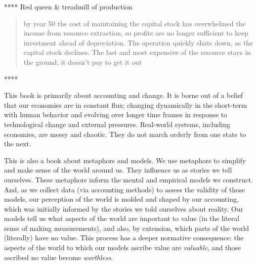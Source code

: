 
****	Red queen \& treadmill of production





\begin{quote}
by year 50 the cost of maintaining the capital stock 
has overwhelmed the income from resource extraction, 
so profits are no longer sufficient to keep investment ahead of depreciation. 
The operation quickly shuts down, as the capital stock declines. 
The last and most expensive of the resource stays in the ground; 
it doesn't pay to get it out~\cite[p.60]{Meadows2008}
\end{quote}
****

This book is primarily about accounting and change.
It is borne out of a belief that our economies are in constant flux;
changing dynamically in the short-term with human behavior
and evolving over longer time frames 
in response to technological change and
external pressures.
Real-world systems, including economies, are messy and chaotic.
They do not march orderly from one state to the next.

This is also a book about metaphors and models.
We use metaphors to simplify and make sense of the world around us.
They influence us as stories we tell ourselves.
These metaphors inform the mental and empirical models we construct.
And, as we collect data (via accounting methods) 
to assess the validity of those models,
our perception of the world is molded and shaped
by our accounting, which was initially informed
by the stories we told ourselves about reality.
Our models tell us what aspects of the world
are important to value 
(in the literal sense of making measurements),
and also, by extension, 
which parts of the world (literally) have no value.
This process has a deeper normative
consequence: the aspects of the world to which our models ascribe
value are \emph{valuable},
and those ascribed no value become \emph{worthless}.


